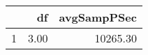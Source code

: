 \begin{table}[h]
\centering
\begin{tabular}{rrr}
  \hline
 & df & avgSampPSec \\ 
  \hline
1 & 3.00 & 10265.30 \\ 
   \hline
\end{tabular}
\end{table}
